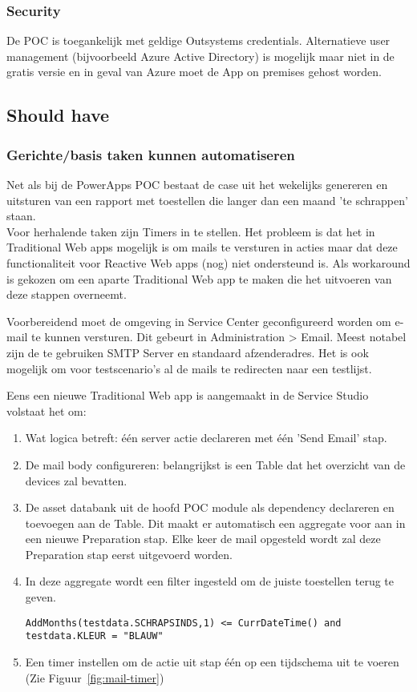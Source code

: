 \subsubsection{Security}

De POC is toegankelijk met geldige Outsystems credentials. Alternatieve user management (bijvoorbeeld Azure Active Directory) is mogelijk maar niet in de gratis versie en in geval van Azure moet de App on premises gehost worden.

\subsection{Should have}

\subsubsection{Gerichte/basis taken kunnen automatiseren}
\label{subsec:os-automatisatie}

Net als bij de PowerApps POC bestaat de case uit het wekelijks genereren en uitsturen van een rapport met toestellen die langer dan een maand 'te schrappen' staan.\\
Voor herhalende taken zijn Timers in te stellen. Het probleem is dat het in Traditional Web apps mogelijk is om mails te versturen in acties maar dat deze functionaliteit voor Reactive Web apps (nog) niet ondersteund is. Als workaround is gekozen om een aparte Traditional Web app te maken die het uitvoeren van deze stappen overneemt.

Voorbereidend moet de omgeving in Service Center geconfigureerd worden om e-mail te kunnen versturen. Dit gebeurt in Administration > Email. Meest notabel zijn de te gebruiken SMTP Server en standaard afzenderadres. Het is ook mogelijk om voor testscenario's al de mails te redirecten naar een testlijst.

Eens een nieuwe Traditional Web app is aangemaakt in de Service Studio volstaat het om:
\begin{enumerate}
    \item Wat logica betreft: één server actie declareren met één 'Send Email' stap.
    \item De mail body configureren: belangrijkst is een Table dat het overzicht van de devices zal bevatten.
    \item De asset databank uit de hoofd POC module als dependency declareren en toevoegen aan de Table. Dit maakt er automatisch een aggregate voor aan in een nieuwe Preparation stap. Elke keer de mail opgesteld wordt zal deze Preparation stap eerst uitgevoerd worden.
    \item In deze aggregate wordt een filter ingesteld om de juiste toestellen terug te geven.
\begin{lstlisting}
AddMonths(testdata.SCHRAPSINDS,1) <= CurrDateTime() and testdata.KLEUR = "BLAUW"
\end{lstlisting} 
    \item Een timer instellen om de actie uit stap één op een tijdschema uit te voeren (Zie Figuur~\ref{fig:mail-timer})
\end{enumerate}

